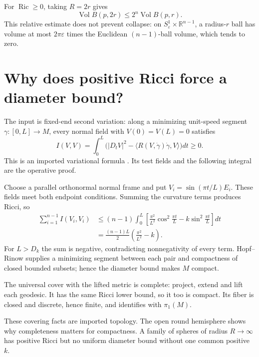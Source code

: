 \documentclass[12pt,reqno]{amsart}
\begin{document}
For \(\operatorname{Ric}\ge0\), taking \(R=2r\) gives
\[
\operatorname{Vol}B(p,2r)\le2^n\operatorname{Vol}B(p,r).
\]
This relative estimate does not prevent collapse: on \(S^1_\varepsilon\times\mathbb R^{n-1}\), a radius-\(r\) ball has volume at most \(2\pi\varepsilon\) times the Euclidean \((n-1)\)-ball volume, which tends to zero.

\section{Why does positive Ricci force a diameter bound?}
\label{sec:myers}

\begin{samepage}
\begin{theorem}
\label{thm:myers}

\end{theorem}
\end{samepage}

The input is fixed-end second variation: along a minimizing unit-speed segment \(\gamma:[0,L]\to M\), every normal field with \(V(0)=V(L)=0\) satisfies
\[
I(V,V)=\int_0^L\bigl(|D_tV|^2-\langle R(V,\dot\gamma)\dot\gamma,V\rangle\bigr)dt\ge0.
\]
This is an imported variational formula \cite[Section 7.1]{S-Bishop-2013v2}. Its test fields and the following integral are the operative proof.

Choose a parallel orthonormal normal frame and put \(V_i=\sin(\pi t/L)E_i\). These fields meet both endpoint conditions. Summing the curvature terms produces Ricci, so
\[
\begin{aligned}
\sum_{i=1}^{n-1}I(V_i,V_i)
&\le(n-1)\int_0^L\left[\frac{\pi^2}{L^2}\cos^2\frac{\pi t}{L}
-k\sin^2\frac{\pi t}{L}\right]dt\\
&=\frac{(n-1)L}{2}\left(\frac{\pi^2}{L^2}-k\right).
\end{aligned}
\]
For \(L>D_k\) the sum is negative, contradicting nonnegativity of every term. Hopf--Rinow supplies a minimizing segment between each pair and compactness of closed bounded subsets; hence the diameter bound makes \(M\) compact.

The universal cover with the lifted metric is complete: project, extend and lift each geodesic. It has the same Ricci lower bound, so it too is compact. Its fiber is closed and discrete, hence finite, and identifies with \(\pi_1(M)\).

These covering facts are imported topology. The open round hemisphere shows why completeness matters for compactness. A family of spheres of radius \(R\to\infty\) has positive Ricci but no uniform diameter bound without one common positive \(k\).
\end{document}
